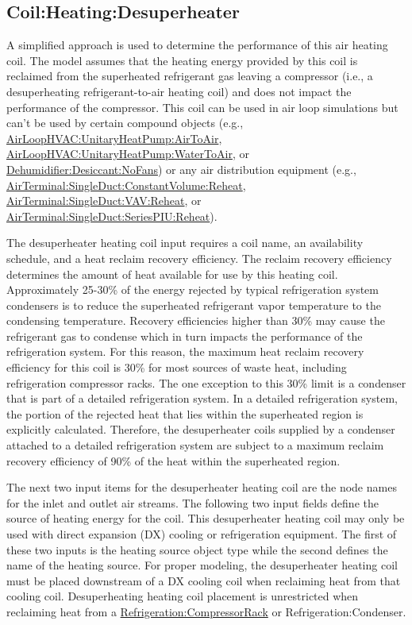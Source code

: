 \subsection{Coil:Heating:Desuperheater}\label{coilheatingdesuperheater}

A simplified approach is used to determine the performance of this air heating coil. The model assumes that the heating energy provided by this coil is reclaimed from the superheated refrigerant gas leaving a compressor (i.e., a desuperheating refrigerant-to-air heating coil) and does not impact the performance of the compressor. This coil can be used in air loop simulations but can't be used by certain compound objects (e.g., \hyperref[airloophvacunitaryheatpumpairtoair]{AirLoopHVAC:UnitaryHeatPump:AirToAir}, \hyperref[airloophvacunitaryheatpumpwatertoair]{AirLoopHVAC:UnitaryHeatPump:WaterToAir}, or \hyperref[dehumidifierdesiccantnofans]{Dehumidifier:Desiccant:NoFans}) or any air distribution equipment (e.g., \hyperref[airterminalsingleductconstantvolumereheat]{AirTerminal:SingleDuct:ConstantVolume:Reheat}, \hyperref[airterminalsingleductvavreheat]{AirTerminal:SingleDuct:VAV:Reheat}, or \hyperref[airterminalsingleductseriespiureheat]{AirTerminal:SingleDuct:SeriesPIU:Reheat}).

The desuperheater heating coil input requires a coil name, an availability schedule, and a heat reclaim recovery efficiency. The reclaim recovery efficiency determines the amount of heat available for use by this heating coil. Approximately 25-30\% of the energy rejected by typical refrigeration system condensers is to reduce the superheated refrigerant vapor temperature to the condensing temperature. Recovery efficiencies higher than 30\% may cause the refrigerant gas to condense which in turn impacts the performance of the refrigeration system. For this reason, the maximum heat reclaim recovery efficiency for this coil is 30\% for most sources of waste heat, including refrigeration compressor racks. The one exception to this 30\% limit is a condenser that is part of a detailed refrigeration system. In a detailed refrigeration system, the portion of the rejected heat that lies within the superheated region is explicitly calculated. Therefore, the desuperheater coils supplied by a condenser attached to a detailed refrigeration system are subject to a maximum reclaim recovery efficiency of 90\% of the heat within the superheated region.

The next two input items for the desuperheater heating coil are the node names for the inlet and outlet air streams. The following two input fields define the source of heating energy for the coil. This desuperheater heating coil may only be used with direct expansion (DX) cooling or refrigeration equipment. The first of these two inputs is the heating source object type while the second defines the name of the heating source. For proper modeling, the desuperheater heating coil must be placed downstream of a DX cooling coil when reclaiming heat from that cooling coil. Desuperheating heating coil placement is unrestricted when reclaiming heat from a \hyperref[refrigerationcompressorrack]{Refrigeration:CompressorRack} or Refrigeration:Condenser.

